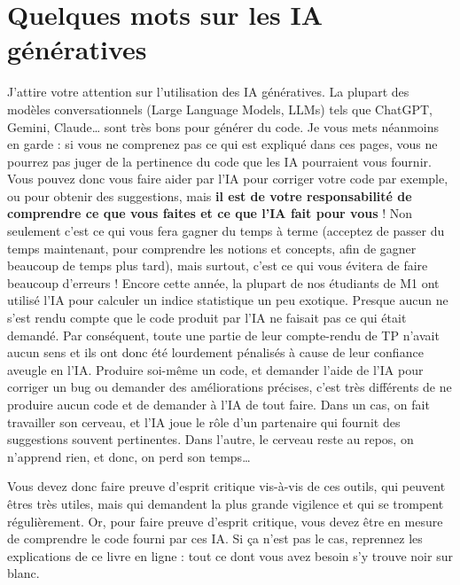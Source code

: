 \documentclass[
  french,
  a4paper,
  DIV=11,
  numbers=noendperiod,
  oneside]{scrreprt}
\begin{document}
\section*{Quelques mots sur les IA
génératives}\label{quelques-mots-sur-les-ia-guxe9nuxe9ratives}


J'attire votre attention sur l'utilisation des IA génératives. La
plupart des modèles conversationnels (Large Language Models, LLMs) tels
que ChatGPT, Gemini, Claude\ldots{} sont très bons pour générer du code.
Je vous mets néanmoins en garde : si vous ne comprenez pas ce qui est
expliqué dans ces pages, vous ne pourrez pas juger de la pertinence du
code que les IA pourraient vous fournir. Vous pouvez donc vous faire
aider par l'IA pour corriger votre code par exemple, ou pour obtenir des
suggestions, mais \textbf{il est de votre responsabilité de comprendre
ce que vous faites et ce que l'IA fait pour vous} ! Non seulement c'est
ce qui vous fera gagner du temps à terme (acceptez de passer du temps
maintenant, pour comprendre les notions et concepts, afin de gagner
beaucoup de temps plus tard), mais surtout, c'est ce qui vous évitera de
faire beaucoup d'erreurs ! Encore cette année, la plupart de nos
étudiants de M1 ont utilisé l'IA pour calculer un indice statistique un
peu exotique. Presque aucun ne s'est rendu compte que le code produit
par l'IA ne faisait pas ce qui était demandé. Par conséquent, toute une
partie de leur compte-rendu de TP n'avait aucun sens et ils ont donc été
lourdement pénalisés à cause de leur confiance aveugle en l'IA. Produire
soi-même un code, et demander l'aide de l'IA pour corriger un bug ou
demander des améliorations précises, c'est très différents de ne
produire aucun code et de demander à l'IA de tout faire. Dans un cas, on
fait travailler son cerveau, et l'IA joue le rôle d'un partenaire qui
fournit des suggestions souvent pertinentes. Dans l'autre, le cerveau
reste au repos, on n'apprend rien, et donc, on perd son temps\ldots{}

Vous devez donc faire preuve d'esprit critique vis-à-vis de ces outils,
qui peuvent êtres très utiles, mais qui demandent la plus grande
vigilence et qui se trompent régulièrement. Or, pour faire preuve
d'esprit critique, vous devez être en mesure de comprendre le code
fourni par ces IA. Si ça n'est pas le cas, reprennez les explications de
ce livre en ligne : tout ce dont vous avez besoin s'y trouve noir sur
blanc.
\end{document}
